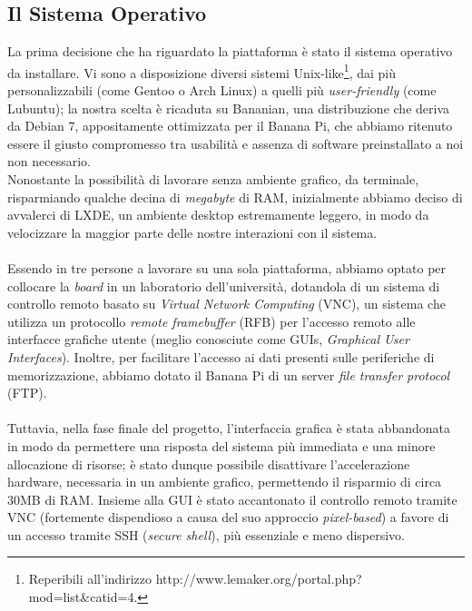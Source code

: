 \subsection{Il Sistema Operativo}
La prima decisione che ha riguardato la piattaforma è stato il sistema 
operativo da installare. Vi sono a disposizione diversi sistemi 
Unix-like\footnote{Reperibili all'indirizzo
http://www.lemaker.org/portal.php?mod=list\&catid=4.}, 
dai più personalizzabili (come Gentoo o Arch Linux) a quelli più
 \emph{user-friendly} (come Lubuntu); la nostra scelta è ricaduta su Bananian, 
una distribuzione che deriva da Debian 7, appositamente ottimizzata per il 
Banana Pi, che abbiamo ritenuto essere il giusto compromesso tra usabilità
e assenza di software preinstallato a noi non necessario. \\
Nonostante la possibilità di lavorare senza ambiente grafico, da terminale, 
risparmiando qualche decina di \emph{megabyte} di RAM, inizialmente abbiamo 
deciso di avvalerci di LXDE, un ambiente desktop estremamente leggero, in modo 
da 
velocizzare la maggior parte delle nostre interazioni con il sistema.
\\ \\
Essendo in tre persone a lavorare su una sola piattaforma, abbiamo optato 
per collocare la \emph{board} in un laboratorio dell'università, dotandola
di un sistema di controllo remoto basato su \emph{Virtual Network Computing} 
(VNC), un sistema che utilizza un protocollo \emph{remote framebuffer} (RFB) 
per l'accesso remoto alle interfacce grafiche utente (meglio conosciute come 
GUIs, \emph{Graphical User Interfaces}). Inoltre, 
per facilitare l'accesso ai dati presenti sulle periferiche di memorizzazione, 
abbiamo dotato il Banana Pi di un server \emph{file transfer protocol} (FTP).
\\ \\
Tuttavia, nella fase finale del progetto, l'interfaccia grafica è stata 
abbandonata in modo da permettere una risposta del sistema più immediata e una 
minore allocazione di risorse; è stato dunque possibile disattivare 
l'accelerazione hardware, necessaria in un ambiente grafico, permettendo il 
risparmio di circa 30MB di RAM. Insieme alla GUI è stato accantonato il 
controllo remoto tramite VNC (fortemente dispendioso a causa del suo approccio 
\emph{pixel-based}) a favore di un accesso tramite SSH (\emph{secure shell}), 
più essenziale e meno dispersivo.
